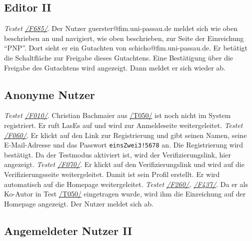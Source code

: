 \subsection{Editor II}
\begin{description}

	 \emph{Testet \hyperref[funkt:685]{/F685/}}.
	Der Nutzer guerster@fim.uni-passau.de meldet sich wie oben beschrieben an und navigiert, wie oben beschrieben, zur Seite der Einreichung ``P\neq NP''.
	Dort sieht er ein Gutachten von schicho@fim.uni-passau.de.
	Er betätigt die Schaltfläche zur Freigabe dieses Gutachtens.
	Eine Bestätigung über die Freigabe des Gutachtens wird angezeigt.
	Dann meldet er sich wieder ab.

\end{description}

\subsection{Anonyme Nutzer}

\begin{description}
	 \emph{Testet \hyperref[funkt:010]{/F010/}}.
	Christian Bachmaier aus \hyperref[t050]{/T050/} ist noch nicht im System registriert.
	Er ruft LasEs auf und wird zur Anmeldeseite weitergeleitet.
	 \emph{Testet \hyperref[funkt:060]{/F060/}}.
	Er klickt auf den Link zur Registrierung und gibt seinen Namen, seine E-Mail-Adresse und das Passwort \texttt{einsZwei3!5678} an.
	Die Registrierung wird bestätigt.
	Da der Testmodus aktiviert ist, wird der Verifizierungslink, hier angezeigt.
	 \emph{Testet \hyperref[funkt:070]{/F070/}}.
	Er klickt auf den Verifizierungslink und wird auf die Verifizierungsseite weitergeleitet.
	Damit ist sein Profil erstellt.
	Er wird automatisch auf die Homepage weitergeleitet.
	 \emph{Testet \hyperref[funkt:260]{/F260/}, \hyperref[funkt:437]{/F437/}}.
	Da er als Ko-Autor in Test \hyperref[t050]{/T050/} eingetragen wurde, wird ihm die Einreichung auf der Homepage angezeigt.
	Der Nutzer meldet sich ab.
\end{description}

\subsection{Angemeldeter Nutzer II}

